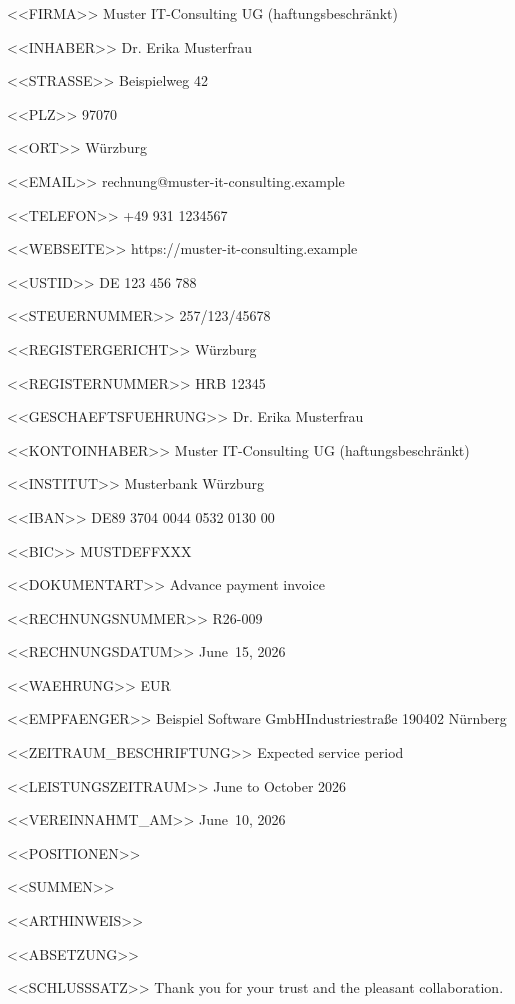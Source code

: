 <<FIRMA>>
Muster IT-Consulting UG (haftungsbeschränkt)

<<INHABER>>
Dr. Erika Musterfrau

<<STRASSE>>
Beispielweg 42

<<PLZ>>
97070

<<ORT>>
Würzburg

<<EMAIL>>
rechnung@muster-it-consulting.example

<<TELEFON>>
+49 931 1234567

<<WEBSEITE>>
https://muster-it-consulting.example

<<USTID>>
DE 123 456 788

<<STEUERNUMMER>>
257/123/45678

<<REGISTERGERICHT>>
Würzburg

<<REGISTERNUMMER>>
HRB 12345

<<GESCHAEFTSFUEHRUNG>>
Dr. Erika Musterfrau

<<KONTOINHABER>>
Muster IT-Consulting UG (haftungsbeschränkt)

<<INSTITUT>>
Musterbank Würzburg

<<IBAN>>
DE89 3704 0044 0532 0130 00

<<BIC>>
MUSTDEFFXXX

<<DOKUMENTART>>
Advance payment invoice

<<RECHNUNGSNUMMER>>
R26-009

<<RECHNUNGSDATUM>>
June~15, 2026

<<WAEHRUNG>>
EUR

<<EMPFAENGER>>
Beispiel Software GmbH\zeilenwechsel{}Industriestraße 1\zeilenwechsel{}90402 Nürnberg

<<ZEITRAUM_BESCHRIFTUNG>>
Expected service period

<<LEISTUNGSZEITRAUM>>
June to October 2026

<<VEREINNAHMT_AM>>
June~10, 2026

<<POSITIONEN>>

<<SUMMEN>>
   \summentrenner{}

<<ARTHINWEIS>>

<<ABSETZUNG>>

<<SCHLUSSSATZ>>
Thank you for your trust and the pleasant collaboration.

